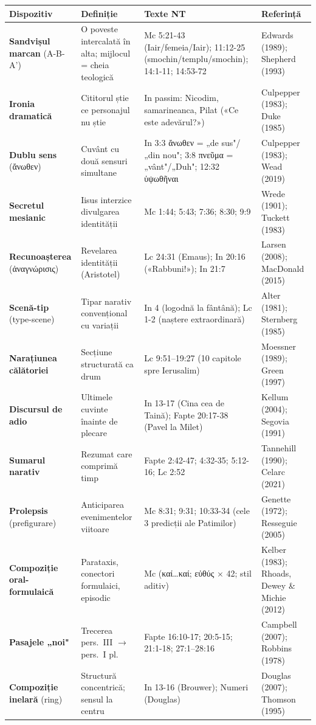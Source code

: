 \documentclass[12pt,a4paper,twoside,openany]{book}
\begin{document}
\begin{center}
\footnotesize
\begin{tabular}{L{2.2cm}L{3cm}L{4.5cm}L{3cm}}
\toprule
{}
\textbf{Dispozitiv} & \textbf{Definiție} & \textbf{Texte NT} & \textbf{Referință} \\
\midrule
\textbf{Sandvișul marcan} (A-B-A') & O poveste intercalată în alta; mijlocul = cheia teologică & Mc 5:21-43 (Iair/femeia/Iair); 11:12-25 (smochin/templu/smochin); 14:1-11; 14:53-72 & Edwards (1989); Shepherd (1993) \\
\textbf{Ironia dramatică} & Cititorul știe ce personajul nu știe & In passim: Nicodim, samarineanca, Pilat («Ce este adevărul?») & Culpepper (1983); Duke (1985) \\
\textbf{Dublu sens} (ἄνωθεν) & Cuvânt cu două sensuri simultane & In 3:3 ἄνωθεν = „de sus"/„din nou"; 3:8 πνεῦμα = „vânt"/„Duh"; 12:32 ὑψωθῆναι & Culpepper (1983); Wead (2019) \\
\textbf{Secretul mesianic} & Iisus interzice divulgarea identității & Mc 1:44; 5:43; 7:36; 8:30; 9:9 & Wrede (1901); Tuckett (1983) \\
\textbf{Recunoașterea} (ἀναγνώρισις) & Revelarea identității (Aristotel) & Lc 24:31 (Emaus); In 20:16 («Rabbuni!»); In 21:7 & Larsen (2008); MacDonald (2015) \\
\textbf{Scenă-tip} (type-scene) & Tipar narativ convențional cu variații & In 4 (logodnă la fântână); Lc 1-2 (naștere extraordinară) & Alter (1981); Sternberg (1985) \\
\textbf{Narațiunea călătoriei} & Secțiune structurată ca drum & Lc 9:51--19:27 (10 capitole spre Ierusalim) & Moessner (1989); Green (1997) \\
\textbf{Discursul de adio} & Ultimele cuvinte înainte de plecare & In 13-17 (Cina cea de Taină); Fapte 20:17-38 (Pavel la Milet) & Kellum (2004); Segovia (1991) \\
\textbf{Sumarul narativ} & Rezumat care comprimă timp & Fapte 2:42-47; 4:32-35; 5:12-16; Lc 2:52 & Tannehill (1990); Celarc (2021) \\
\textbf{Prolepsis} (prefigurare) & Anticiparea evenimentelor viitoare & Mc 8:31; 9:31; 10:33-34 (cele 3 predicții ale Patimilor) & Genette (1972); Resseguie (2005) \\
\textbf{Compoziție oral-formulaică} & Parataxis, conectori formulaici, episodic & Mc (καί\ldots καί; εὐθύς $\times$ 42; stil aditiv) & Kelber (1983); Rhoads, Dewey \& Michie (2012) \\
\textbf{Pasajele „noi"} & Trecerea pers.\ III $\rightarrow$ pers.\ I pl. & Fapte 16:10-17; 20:5-15; 21:1-18; 27:1--28:16 & Campbell (2007); Robbins (1978) \\
\textbf{Compoziție inelară} (ring) & Structură concentrică; sensul la centru & In 13-16 (Brouwer); Numeri (Douglas) & Douglas (2007); Thomson (1995) \\
\bottomrule
\end{tabular}
\end{center}
\normalsize
\end{document}
